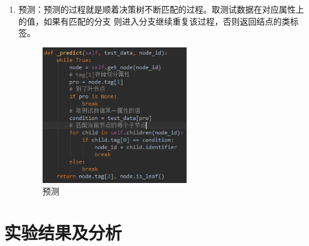\documentclass[UTF8,a4paper,12pt]{article}
\begin{document}
\begin{enumerate}[itemindent=0.5em,label=\arabic*、]
\begin{figure}[h]
  \end{figure}
  \item 预测：预测的过程就是顺着决策树不断匹配的过程。取测试数据在对应属性上的值，如果有匹配的分支
  则进入分支继续重复该过程，否则返回结点的类标签。
  \begin{figure}[h]
  \begin{center}
  \includegraphics[width=0.6\textwidth]{p6.png} %
  \caption{预测}
  \end{center}
  \end{figure}
\end{enumerate}

\section{实验结果及分析}
\end{document}

